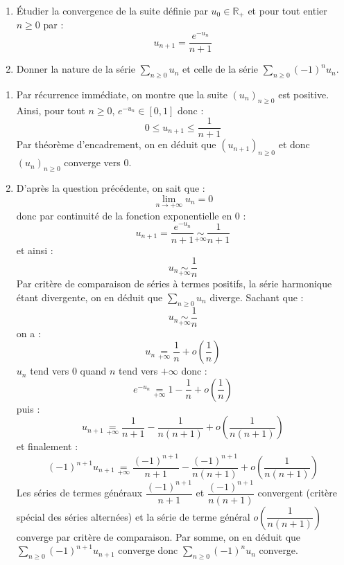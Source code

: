\documentclass[a4paper,10pt]{report}
\newcommand{\Sum}[2]{\ensuremath{\textstyle{\sum\limits_{#1}^{#2}}}}
\begin{document}
\medskip

\begin{Exercice}{}  
\begin{enumerate}
\item Étudier la convergence de la suite définie par $u_0 \in \mathbb{R}_+$ et pour tout entier $n \geq 0$ par :
 \[
u_{n + 1} = \frac{e^{ - u_n}}{n + 1}
 \]
\item Donner la nature de la série $\Sum{n \geq 0}{} u_n$ et celle de la série $\Sum{n \geq 0}{} (-1)^n u_n$.
\end{enumerate}
\end{Exercice}

\corr 

\begin{enumerate}
\item Par récurrence immédiate, on montre que la suite $(u_n)_{n \geq 0}$ est positive. Ainsi, pour tout $n \geq 0$, $e^{-u_n} \in [0,1]$ donc :
$$ 0 \leq u_{n+1} \leq \dfrac{1}{n+1}$$
Par théorème d'encadrement, on en déduit que $(u_{n+1})_{n \geq 0}$ et donc $(u_n)_{n \geq 0}$ converge vers $0$.
\item D'après la question précédente, on sait que :
$$ \lim_{n \rightarrow + \infty} u_n = 0$$
donc par continuité de la fonction exponentielle en $0$ :
$$ u_{n+1} = \dfrac{e^{-u_n}}{n+1} \underset{+ \infty}{\sim} \dfrac{1}{n+1}$$
et ainsi :
$$ u_n \underset{+ \infty}{\sim} \dfrac{1}{n}$$
Par critère de comparaison de séries à termes positifs, la série harmonique étant divergente, on en déduit que $\Sum{n \geq 0}{} u_n$ diverge. Sachant que :
$$  u_n \underset{+ \infty}{\sim} \dfrac{1}{n}$$
on a :
$$ u_n \underset{+\infty}{=} \dfrac{1}{n} + o \left( \dfrac{1}{n} \right)$$
$u_n$ tend vers $0$ quand $n$ tend vers $+ \infty$ donc :
$$ e^{-u_n} \underset{+\infty}{=} 1 -\dfrac{1}{n} + o \left( \dfrac{1}{n} \right)$$
puis :
$$ u_{n+1} \underset{+\infty}{=} \dfrac{1}{n+1} - \dfrac{1}{n(n+1)} + o \left( \dfrac{1}{n(n+1)} \right)$$
et finalement :
$$ (-1)^{n+1} u_{n+1} \underset{+\infty}{=} \dfrac{(-1)^{n+1}}{n+1} - \dfrac{(-1)^{n+1}}{n(n+1)} + o \left( \dfrac{1}{n(n+1)} \right)$$
Les séries de termes généraux $\dfrac{(-1)^{n+1}}{n+1}$ et $\dfrac{(-1)^{n+1}}{n(n+1)}$ convergent (critère spécial des séries alternées) et la série de terme général $o \left( \dfrac{1}{n(n+1)} \right)$ converge par critère de comparaison. Par somme, on en déduit que $\Sum{n \geq 0}{} (-1)^{n+1} u_{n+1}$ converge donc $\Sum{n \geq 0}{} (-1)^n u_n$ converge.
\end{enumerate}
\end{document}
